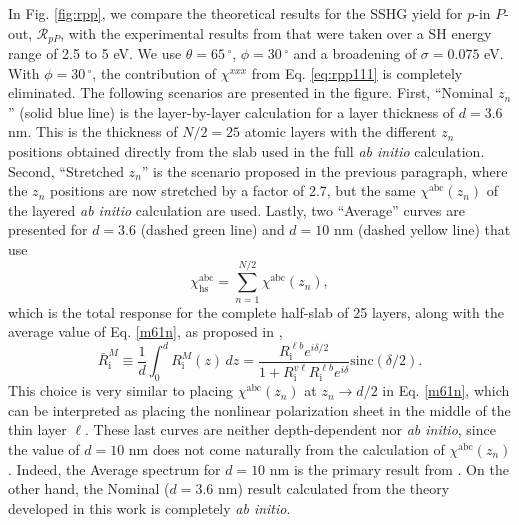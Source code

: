 \documentclass[utf8]{frontiersSCNS}
\begin{document}
In Fig. \ref{fig:rpp}, we compare the theoretical results for the SSHG yield for
$p$-in $P$-out, $\mathcal{R}_{pP}$, with the experimental results from
\cite{mejiaPRB02} that were taken over a SH energy range of 2.5 to 5 eV. We use
$\theta=65\,^{\circ}$, $\phi = 30\,^{\circ}$ and a broadening of $\sigma =
0.075$ eV. With $\phi = 30\,^{\circ}$, the contribution of $\chi^{xxx}$ from Eq.
\eqref{eq:rpp111} is completely eliminated. 
{\color{red}
The following scenarios are presented in the figure. First, ``Nominal $z_{n}$''
(solid blue line) is the layer-by-layer calculation for a layer thickness of $d
= 3.6$ nm. This is the thickness of $N/2=25$ atomic layers with the different
$z_{n}$ positions obtained directly from the slab used in the full \emph{ab
initio} calculation. Second, ``Stretched $z_{n}$'' is the scenario proposed in
the previous paragraph, where the $z_{n}$ positions are now stretched by a
factor of 2.7, but the same $\chi^{\mathrm{abc}}(z_{n})$ of the layered \emph{ab
initio} calculation are used. Lastly, two ``Average'' curves are presented for
$d = 3.6$ (dashed green line) and $d = 10$ nm (dashed yellow line) that use
\begin{equation}\label{zp.60}
\chi^{\mathrm{abc}}_{\mathrm{hs}}
=\sum_{n=1}^{N/2}
\chi^{\mathrm{abc}}(z_{n}) ,
\end{equation}  
which is the total response for the complete half-slab of 25 layers, along with
the average value of Eq. \eqref{m61n}, as proposed in
\cite{andersonPRB16b},
\begin{equation}\label{rave}
\bar{R}^{M}_{\mathrm{i}}
\equiv\frac{1}{d}\int^d_0 R^{M}_{\mathrm{i}}(z)\,dz  = 
\frac{R^{\ell b}_{\mathrm{i}}e^{i\delta/2}}
     {1+R^{v\ell}_{\mathrm{i}} R^{\ell b}_{\mathrm{i}}e^{i\delta}}
\mathrm{sinc}(\delta/2).
\end{equation} 
This choice is very similar to placing $\chi^{\mathrm{abc}}(z_{n})$ at $z_{n}
\to d/2$ in Eq. \eqref{m61n}, which can be interpreted as placing the nonlinear
polarization sheet in the middle of the thin layer $\ell$. These last curves are
neither depth-dependent nor \emph{ab initio}, since the value of $d = 10$ nm
does not come naturally from the calculation of $\chi^{\mathrm{abc}}(z_{n})$.
Indeed, the Average spectrum for $d = 10$ nm is the primary result from
\cite{andersonPRB16b}. On the other hand, the Nominal ($d = 3.6$ nm) result
calculated from the theory developed in this work is completely \emph{ab
initio}.
}
\end{document}
